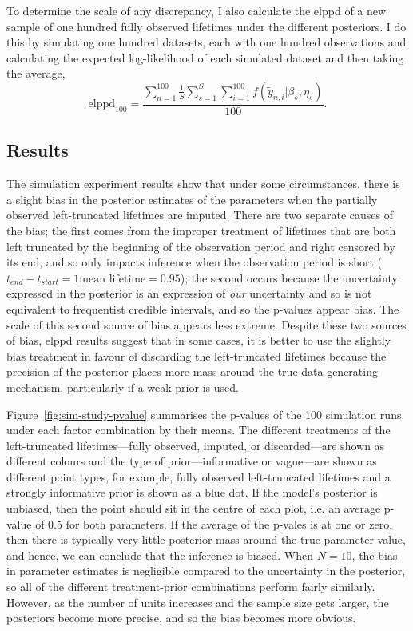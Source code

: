 To determine the scale of any discrepancy, I also calculate the elppd of a new sample of one hundred fully observed lifetimes under the different posteriors. I do this by simulating one hundred datasets, each with one hundred observations and calculating the expected log-likelihood of each simulated dataset and then taking the average,
\begin{equation*}
    \label{eq:elppd-100}
    \text{elppd}_{100} = \frac{\sum_{n = 1}^{100}\frac{1}{S}\sum_{s = 1}^{S}\sum_{i = 1}^{100}f(\tilde{y}_{n, i}|\beta_s, \eta_s)}{100}.
\end{equation*}

\subsection{Results}

The simulation experiment results show that under some circumstances, there is a slight bias in the posterior estimates of the parameters when the partially observed left-truncated lifetimes are imputed. There are two separate causes of the bias; the first comes from the improper treatment of lifetimes that are both left truncated by the beginning of the observation period and right censored by its end, and so only impacts inference when the observation period is short ($t_{end} - t_{start} = 1 \text{mean lifetime} = 0.95$); the second occurs because the uncertainty expressed in the posterior is an expression of \textit{our} uncertainty and so is not equivalent to frequentist credible intervals, and so the p-values appear bias. The scale of this second source of bias appears less extreme. Despite these two sources of bias, elppd results suggest that in some cases, it is better to use the slightly bias treatment in favour of discarding the left-truncated lifetimes because the precision of the posterior places more mass around the true data-generating mechanism, particularly if a weak prior is used.

Figure~\ref{fig:sim-study-pvalue} summarises the p-values of the 100 simulation runs under each factor combination by their means. The different treatments of the left-truncated lifetimes---fully observed, imputed, or discarded---are shown as different colours and the type of prior---informative or vague---are shown as different point types, for example, fully observed left-truncated lifetimes and a strongly informative prior is shown as a blue dot. If the model's posterior is unbiased, then the point should sit in the centre of each plot, i.e. an average p-value of $0.5$ for both parameters. If the average of the p-vales is at one or zero, then there is typically very little posterior mass around the true parameter value, and hence, we can conclude that the inference is biased. When $N = 10$, the bias in parameter estimates is negligible compared to the uncertainty in the posterior, so all of the different treatment-prior combinations perform fairly similarly. However, as the number of units increases and the sample size gets larger, the posteriors become more precise, and so the bias becomes more obvious.

